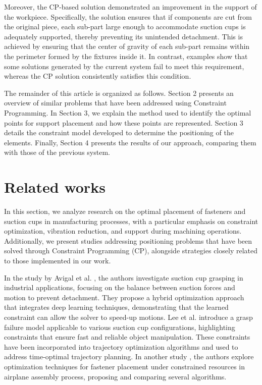 \documentclass[runningheads]{llncs}
\begin{document}
Moreover, the CP-based solution demonstrated an improvement in the support of the workpiece. Specifically, the solution ensures that if components are cut from the original piece, each sub-part large enough to accommodate suction cups is adequately supported, thereby preventing its unintended detachment. This is achieved by ensuring that the center of gravity of each sub-part remains within the perimeter formed by the fixtures inside it. In contrast, examples show that some solutions generated by the current system fail to meet this requirement, whereas the CP solution consistently satisfies this condition.

The remainder of this article is organized as follows. Section 2 presents an overview of similar problems that have been addressed using Constraint Programming. In Section 3, we explain the method used to identify the optimal points for support placement and how these points are represented. Section 3 details the constraint model developed to determine the positioning of the elements. Finally, Section 4 presents the results of our approach, comparing them with those of the previous system.




\section{Related works}

In this section, we analyze research on the optimal placement of fasteners and suction cups in manufacturing processes, with a particular emphasis on constraint optimization, vibration reduction, and support during machining operations. Additionally, we present studies addressing positioning problems that have been solved through Constraint Programming (CP), alongside strategies closely related to those implemented in our work.

In the study by Avigal et al. \cite{avigal2022gomp}, the authors investigate suction cup grasping in industrial applications, focusing on the balance between suction forces and motion to prevent detachment. They propose a hybrid optimization approach that integrates deep learning techniques, demonstrating that the learned constraint can allow the solver to speed-up motions. Lee et al. \cite{lee2024grasp} introduce a grasp failure model applicable to various suction cup configurations, highlighting constraints that ensure fast and reliable object manipulation. These constraints have been incorporated into trajectory optimization algorithms and used to address time-optimal trajectory planning. In another study \cite{miriyev2020fastener}, the authors explore optimization techniques for fastener placement under constrained resources in airplane assembly process, proposing and comparing several algorithms.
\end{document}
